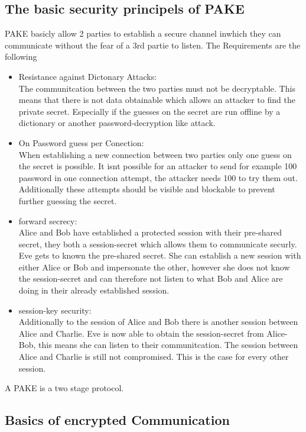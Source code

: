 \documentclass[journal]{IEEEtran}
\begin{document}
\subsection{The basic security principels of PAKE}
PAKE basicly allow 2 parties to establish a secure channel inwhich they can communicate without the fear of a 3rd partie to listen.
The Requirements are the following
\begin{itemize}[]
    \item Resistance against Dictonary Attacks: \\
        The communitcation between the two parties must not be decryptable. This means that there is not data obtainable which allows an attacker to find the private secret. 
        Especially if the guesses on the secret are run offline by a dictionary or another password-decryption like attack.
    \item On Password guess per Conection: \\
        When establishing a new connection between two parties only one guess on the secret is possible. It isnt possible for an attacker to send for example 100 password in one connection attempt, the attacker needs 100 to try them out.
        Additionally these attempts should be visible and blockable to prevent further guessing the secret. 
    \item forward secrecy: \\
        Alice and Bob have established a protected session with their pre-shared secret, they both a session-secret which allows them to communicate securly. Eve gets to known the pre-shared secret. 
        She can establish a new session with either Alice or Bob and impersonate the other, however she does not know the session-secret and can therefore not listen to what Bob and Alice are doing in their already established session.
    \item session-key security: \\
        Additionally to the session of Alice and Bob there is another session between Alice and Charlie. Eve is now able to obtain the session-secret from Alice-Bob, this means she can listen to their communitcation. 
        The session between Alice and Charlie is still not compromised. This is the case for every other session.
\end{itemize}
A PAKE is a two stage protocol.   

\subsection{Basics of encrypted Communication} %
\end{document}
